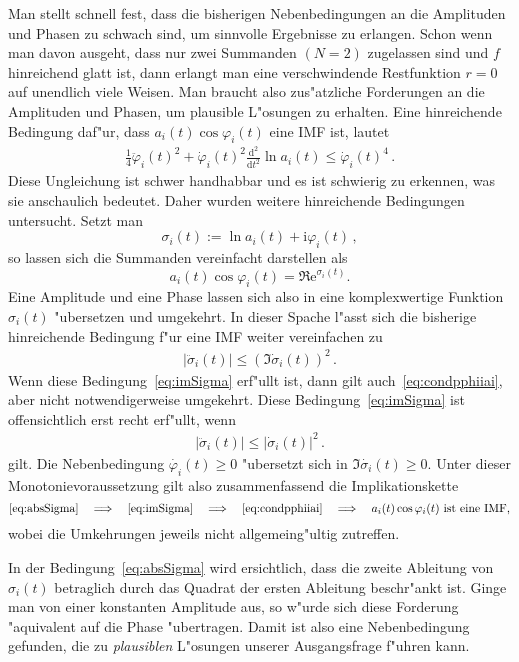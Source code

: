 \documentclass[a4paper]{scrartcl}
\newcommand{\de}{{\mathrm{d}}}
\newcommand{\ee}{{\mathrm{e}}}
\newcommand{\ii}{{\mathrm{i}}}
\newcommand{\pphi}{{\varphi}}
\begin{document}
Man stellt schnell fest, dass die bisherigen Nebenbedingungen an die Amplituden und Phasen zu schwach sind, um sinnvolle Ergebnisse zu erlangen. 
Schon wenn man davon ausgeht, dass nur zwei Summanden $(N=2)$ zugelassen sind und $f$ hinreichend glatt ist, dann erlangt man eine verschwindende Restfunktion $r=0$ auf unendlich viele Weisen.
Man braucht also zus"atzliche Forderungen an die Amplituden und Phasen, um plausible L"osungen zu erhalten. 
Eine hinreichende Bedingung daf"ur, dass $a_i(t)\cos\pphi_i(t)$ eine IMF ist, lautet
\begin{align} \label{eq:condpphiiai}
  \frac14\ddot\pphi_i(t)^2 + \dot\pphi_i(t)^2\frac{\de^2}{\de t^2}\ln a_i(t) 
  \le \dot\pphi_i(t)^4\,.
\end{align}
Diese Ungleichung ist schwer handhabbar und es ist schwierig zu erkennen, was sie anschaulich bedeutet. 
Daher wurden weitere hinreichende Bedingungen untersucht. 
Setzt man
$$ \sigma_i(t) := \ln a_i(t) + \ii\pphi_i(t)\,, $$
so lassen sich die Summanden vereinfacht darstellen als
$$ a_i(t)\cos\pphi_i(t) = \Re \ee^{\sigma_i(t)}. $$
Eine Amplitude und eine Phase lassen sich also in eine komplexwertige Funktion $\sigma_i(t)$ "ubersetzen und umgekehrt. 
In dieser Spache l"asst sich die bisherige hinreichende Bedingung f"ur eine IMF weiter vereinfachen zu
\begin{align} \label{eq:imSigma}
  \lvert\ddot\sigma_i(t)\rvert \le \left(\Im\dot\sigma_i(t)\right)^2\,.
\end{align}
Wenn diese Bedingung~\ref{eq:imSigma} erf"ullt ist, dann gilt auch~\eqref{eq:condpphiiai}, aber nicht notwendigerweise umgekehrt. 
Diese Bedingung~\ref{eq:imSigma} ist offensichtlich erst recht erf"ullt, wenn 
\begin{align} \label{eq:absSigma}
  \lvert\ddot\sigma_i(t)\rvert \le\lvert\dot\sigma_i(t)\rvert^2\,.
\end{align}
gilt. Die Nebenbedingung $\dot{\pphi_i}(t) \ge 0$ "ubersetzt sich in $\Im\dot{\sigma_i}(t) \ge 0$. 
Unter dieser Monotonievoraussetzung gilt also zusammenfassend die Implikationskette 
$$ \text{\eqref{eq:absSigma}} \quad \Longrightarrow \quad
  \text{\eqref{eq:imSigma}} \quad \Longrightarrow \quad
  \text{\eqref{eq:condpphiiai}} \quad \Longrightarrow \quad
  \text{$a_i(t)\cos\pphi_i(t)$ ist eine IMF,} $$
wobei die Umkehrungen jeweils nicht allgemeing"ultig zutreffen. 

In der Bedingung~\eqref{eq:absSigma} wird ersichtlich, dass die zweite Ableitung von $\sigma_i(t)$ betraglich durch das Quadrat der ersten Ableitung beschr"ankt ist. 
Ginge man von einer konstanten Amplitude aus, so w"urde sich diese Forderung "aquivalent auf die Phase "ubertragen. 
Damit ist also eine Nebenbedingung gefunden, die zu {\em plausiblen} L"osungen unserer Ausgangsfrage f"uhren kann. 
\end{document}
